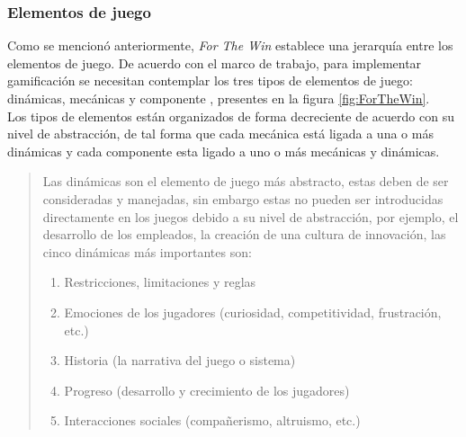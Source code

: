 \subsubsection{Elementos de juego}

 \noindent Como se mencionó anteriormente, {\em For The Win} establece una jerarquía entre los
 elementos de juego. De acuerdo con el marco de trabajo, para implementar gamificación se
 necesitan contemplar los tres tipos de elementos de juego: dinámicas, mecánicas y componente
 \cite[pp. 55-57]{ForTheWin}, presentes en la figura \ref{fig:ForTheWin}.\\

 \noindent Los tipos de elementos están organizados de forma decreciente de acuerdo con su nivel
 de abstracción, de tal forma que cada mecánica está ligada a una o más dinámicas y cada componente
 esta ligado a uno o más mecánicas y dinámicas.\\


 \begin{quote}
    Las dinámicas son el elemento de juego más abstracto, estas deben de ser consideradas y
    manejadas, sin embargo estas no pueden ser introducidas directamente en los juegos debido
    a su nivel de abstracción, por ejemplo, el desarrollo de los empleados, la creación de una
    cultura de innovación, las cinco dinámicas más importantes son:

    \begin{enumerate}
        \item Restricciones, limitaciones y reglas
        \item Emociones de los jugadores (curiosidad, competitividad, frustración, etc.)
        \item Historia (la narrativa del juego o sistema)
        \item Progreso (desarrollo y crecimiento de los jugadores)
        \item Interacciones sociales (compañerismo, altruismo, etc.)
    \end{enumerate}

 \end{quote}

 \clearpage

